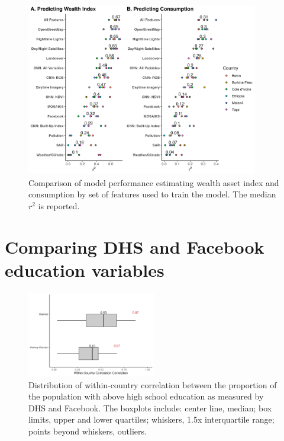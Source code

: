 \documentclass{article}
\begin{document}
\begin{figure}[H]
    \centering
    \includegraphics[width=0.9\textwidth]{figures/lsms_feature_type.png}
    \caption{Comparison of model performance estimating wealth asset index and consumption by set of features used to train the model. The median $r^2$ is reported.}
     \label{fig:lsms_feature_type}
\end{figure}

\color{black}

\newpage
\section{Comparing DHS and Facebook education variables}
\label{si:wi_and_fb_edu}

\begin{figure}[H]
    \centering
    \includegraphics[width=0.5\textwidth]{figures/educ_fb_dhs_boxplot.png}
    \caption{Distribution of within-country correlation between the proportion of the population with above high school education as measured by DHS and Facebook. The boxplots include: center line, median; box limits, upper and lower quartiles; whiskers, 1.5x interquartile range; points beyond whiskers, outliers.}
     \label{fig:educ_fb_dhs_boxplot}
\end{figure}
\end{document}
